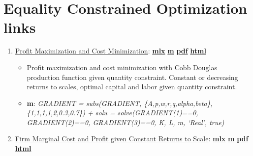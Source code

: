 \documentclass[
]{book}
\providecommand{\tightlist}{%
  \setlength{\itemsep}{0pt}\setlength{\parskip}{0pt}}
\begin{document}
\hypertarget{equality-constrained-optimization-links}{%
\section{Equality Constrained Optimization links}\label{equality-constrained-optimization-links}}

\begin{enumerate}
\def\labelenumi{\arabic{enumi}.}
\tightlist
\item
  \href{https://fanwangecon.github.io/Math4Econ/opti_firm_constrained/htmlpdfm/profit_maximize.html}{Profit Maximization and Cost Minimization}: \href{https://github.com/FanWangEcon/Math4Econ/blob/master/opti_firm_constrained/profit_maximize.mlx}{\textbf{mlx}} \textbar{} \href{https://github.com/FanWangEcon/Math4Econ/blob/master/opti_firm_constrained/htmlpdfm/profit_maximize.m}{\textbf{m}} \textbar{} \href{https://github.com/FanWangEcon/Math4Econ/blob/master/opti_firm_constrained/htmlpdfm/profit_maximize.pdf}{\textbf{pdf}} \textbar{} \href{https://fanwangecon.github.io/Math4Econ/opti_firm_constrained/htmlpdfm/profit_maximize.html}{\textbf{html}}

  \begin{itemize}
  \tightlist
  \item
    Profit maximization and cost minimization with Cobb Douglas production function given quantity constraint. Constant or decreasing returns to scales, optimal capital and labor given quantity constraint.
  \item
    \textbf{m}: \emph{GRADIENT = subs(GRADIENT, \{A,p,w,r,q,alpha,beta\},\{1,1,1,1,2,0.3,0.7\}) + solu = solve(GRADIENT(1)==0, GRADIENT(2)==0, GRADIENT(3)==0, K, L, m, `Real', true)}
  \end{itemize}
\item
  \href{https://fanwangecon.github.io/Math4Econ/opti_firm_constrained/htmlpdfm/profit_maximize_crs_profit.html}{Firm Marginal Cost and Profit given Constant Returns to Scale}: \href{https://github.com/FanWangEcon/Math4Econ/blob/master/opti_firm_constrained/profit_maximize_crs_profit.mlx}{\textbf{mlx}} \textbar{} \href{https://github.com/FanWangEcon/Math4Econ/blob/master/opti_firm_constrained/htmlpdfm/profit_maximize_crs_profit.m}{\textbf{m}} \textbar{} \href{https://github.com/FanWangEcon/Math4Econ/blob/master/opti_firm_constrained/htmlpdfm/profit_maximize_crs_profit.pdf}{\textbf{pdf}} \textbar{} \href{https://fanwangecon.github.io/Math4Econ/opti_firm_constrained/htmlpdfm/profit_maximize_crs_profit.html}{\textbf{html}}


\end{enumerate}
\end{document}
